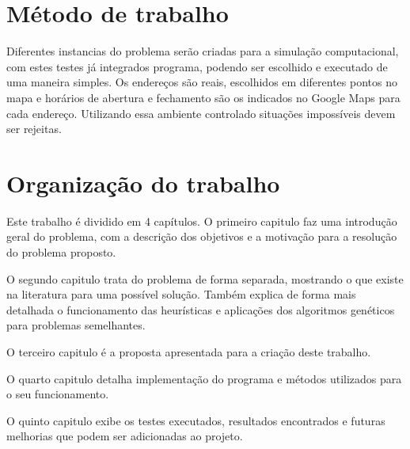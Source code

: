 \section{Método de trabalho}

Diferentes instancias do problema serão criadas para a simulação computacional,  com estes testes já integrados programa, podendo ser escolhido e executado de uma maneira simples. Os endereços são reais, escolhidos em diferentes pontos no mapa e horários de abertura e fechamento são os indicados no Google Maps para cada endereço. 
Utilizando essa ambiente controlado situações impossíveis devem ser rejeitas.

\section{Organização do trabalho}
Este trabalho é dividido em 4 capítulos. 
O primeiro capitulo faz uma introdução geral do problema, com a descrição dos objetivos e a motivação para a resolução do problema proposto.

O segundo capitulo trata do problema de forma separada, mostrando o que existe na literatura para uma possível solução. 
Também explica de forma mais detalhada o funcionamento das heurísticas e aplicações dos algoritmos genéticos para problemas semelhantes.

O terceiro capitulo é a proposta apresentada para a criação deste trabalho.

O quarto capitulo detalha implementação do programa e métodos utilizados para o seu funcionamento.

O quinto capitulo exibe os testes executados, resultados encontrados e futuras melhorias que podem ser adicionadas ao projeto.
